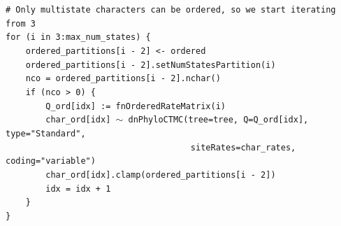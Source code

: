 \documentclass[12pt]{article}
\begin{document}
\begin{flushright}
{\begin{minipage}{16.52cm}
{\hspace*{12pt} \texttt{\# Only multistate characters can be ordered, so we start iterating from 3} \\
\hspace*{12pt} \texttt{for (i in 3:max\_num\_states) \{} \\
\hspace*{12pt} \texttt{\ \ \ \ ordered\_partitions[i - 2] <- ordered} \\
\hspace*{12pt} \texttt{\ \ \ \ ordered\_partitions[i - 2].setNumStatesPartition(i)} \\
\hspace*{12pt} \texttt{\ \ \ \ nco = ordered\_partitions[i - 2].nchar()} \\
\hspace*{12pt} \texttt{\ \ \ \ if (nco > 0) \{} \\
\hspace*{12pt} \texttt{\ \ \ \ \ \ \ \ Q\_ord[idx] := fnOrderedRateMatrix(i)} \\
\hspace*{12pt} \texttt{\ \ \ \ \ \ \ \ char\_ord[idx] {\footnotesize $\sim$} dnPhyloCTMC(tree=tree, Q=Q\_ord[idx], type="Standard",} \\
\hspace*{12pt} \texttt{\ \ \ \ \ \ \ \ \ \ \ \ \ \ \ \ \ \ \ \ \ \ \ \ \ \ \ \ \ \ \ \ \ \, \ \ siteRates=char\_rates, coding="variable")} \\
\hspace*{12pt} \texttt{\ \ \ \ \ \ \ \ char\_ord[idx].clamp(ordered\_partitions[i - 2])} \\
\hspace*{12pt} \texttt{\ \ \ \ \ \ \ \ idx = idx + 1} \\
\hspace*{12pt} \texttt{\ \ \ \ \}} \\
\hspace*{12pt} \texttt{\}} \\

}
\end{minipage}}
\end{flushright}
\end{document}
